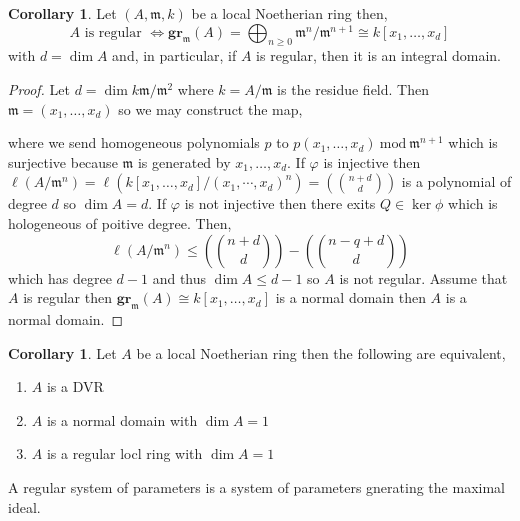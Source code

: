 \documentclass[12pt]{article}
\newcommand{\gr}[2]{\mathbf{gr}_{#1}\left(#2\right)}
\newcommand{\m}{\mathfrak{m}}
\theoremstyle{remark}
\theoremstyle{definition}
\newtheorem{corollary}[theorem]{Corollary}
\newenvironment{definition}[1][Definition:]{\begin{trivlist}
\item[\hskip \labelsep {\bfseries #1}]}{\end{trivlist}}
\begin{document}
\begin{corollary}
Let $(A, \m, k)$ be a local Noetherian ring then,
\[ A \text{ is regular } \iff \gr{\m}{A} = \bigoplus_{n \ge 0} \m^n / \m^{n+1} \cong k[x_1, \dots, x_d] \]
with $d = \dim{A}$ and, in particular, if $A$ is regular, then it is an integral domain. 
\end{corollary}

\begin{proof}
Let $d = \dim{k}{\m / \m^2}$ where $k = A / \m$ is the residue field. Then $\m = (x_1, \dots, x_d)$ so we may construct the map,
\begin{center}
\end{center}
where we send homogeneous polynomials $p$ to $p(x_1, \dots, x_d) \: \text{mod} \: \m^{n + 1}$ which is surjective because $\m$ is generated by $x_1, \dots, x_d$. If $\varphi$ is injective then $\ell(A / \m^n) = \ell\left( k[x_1, \dots, x_d] /(x_1, \cdots, x_d)^n \right) = \left( {n + d \choose d } \right)$ is a polynomial of degree $d$ so $\dim{A} = d$. If $\varphi$ is not injective then there exits $Q \in \ker{\phi}$ which is hologeneous of poitive degree. Then,
\[ \ell(A / \m^n) \le \left( {n+ d \choose d} \right) - \left( {n  - q + d \choose d } \right) \]
which has degree $d - 1$ and thus $\dim{A} \le d  - 1$ so $A$ is not regular. Assume that $A$ is regular then $\gr{\m}{A} \cong k[x_1, \dots, x_d]$ is a normal domain then $A$ is a normal domain.
\end{proof}

\begin{corollary}
Let $A$ be a local Noetherian ring then the following are equivalent,
\begin{enumerate}
\item $A$ is a DVR
\item $A$ is a normal domain with $\dim{A} = 1$
\item $A$ is a regular locl ring with $\dim{A} = 1$
\end{enumerate}
\end{corollary}

\begin{definition}
A regular system of parameters is a system of parameters gnerating the maximal ideal. 
\end{definition}
\end{document}
